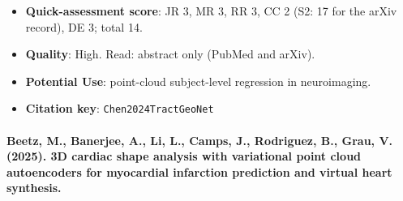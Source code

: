 \documentclass[journal,onecolumn]{IEEEtran}
\begin{document}
\begin{itemize}
\item{} \textbf{Quick-assessment score}: JR 3, MR 3, RR 3, CC 2 (S2: 17 for the arXiv record), DE 3; total 14.

\item{} \textbf{Quality}: High. Read: abstract only (PubMed and arXiv).

\item{} \textbf{Potential Use}: point-cloud subject-level regression in neuroimaging.

\item{} \textbf{Citation key}: \texttt{Chen2024TractGeoNet}

\end{itemize}

\paragraph{Beetz, M., Banerjee, A., Li, L., Camps, J., Rodriguez, B., Grau, V. (2025). 3D cardiac shape analysis with variational point cloud autoencoders for myocardial infarction prediction and virtual heart synthesis.~\cite{Beetz2025PointVAE}}\mbox{}
\end{document}
